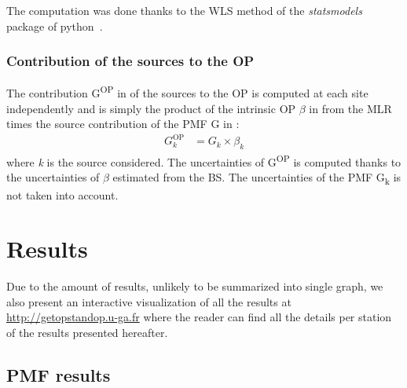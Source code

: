 \documentclass[acp]{copernicus}
\begin{document}
The computation was done thanks to the WLS method of the
\emph{statsmodels} package of python~\citep{seaboldStatsmodels2010}.

\subsubsection{Contribution of the sources to the OP}%
\label{contribution-of-the-sources-to-the-op}

The contribution G\textsuperscript{OP} in of the sources to the OP is
computed at each site independently and is simply the product of the
intrinsic OP $\beta$ in from the MLR times the source contribution of the PMF
G in :
\begin{align}
    G_{k}^{\text{OP}} &= G_{k} \times \beta_{k}
\end{align}
where \emph{k} is the source considered. The uncertainties of
G\textsuperscript{OP} is computed thanks to the uncertainties of $\beta$
estimated from the BS. The uncertainties of the PMF G\textsubscript{k}
is not taken into account.

\section{Results}%
\label{results}

Due to the amount of results, unlikely to be summarized into single
graph, we also present an interactive visualization of all the results
at \href{http://getopstandop.u-ga.fr/}{http://getopstandop.u-ga.fr}
where the reader can find all the details per station of the results
presented hereafter.

\subsection{PMF results}%
\label{pmf-results}
\end{document}
